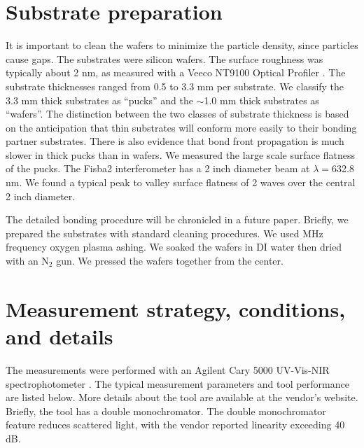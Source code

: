 \documentclass[osajnl,preprint,showpacs,superscriptaddress,12pt]{revtex4-1} %
\begin{document}
\section{Substrate preparation}
It is important to clean the wafers to minimize the particle density, since particles cause gaps.  The substrates were silicon wafers.  The surface roughness was typically about 2 nm, as measured with a Veeco NT9100 Optical Profiler .  The substrate thicknesses ranged from 0.5 to 3.3 mm per substrate.  We classify the 3.3 mm thick substrates as ``pucks'' and the $\sim$1.0 mm thick substrates as ``wafers''.  The distinction between the two classes of substrate thickness is based on the anticipation that thin substrates will conform more easily to their bonding partner substrates.  There is also evidence that bond front propagation is much slower in thick pucks \cite{2007ApOpt..46.6793H} than in wafers.  We measured the large scale surface flatness of the pucks.  The Fisba2 interferometer has a 2 inch diameter beam at $\lambda=$632.8 nm.  We found a typical peak to valley surface flatness of 2 waves over the central 2 inch diameter.


The detailed bonding procedure will be chronicled in a future paper.  Briefly, we prepared the substrates with standard cleaning procedures.  We used MHz frequency oxygen plasma ashing.  We soaked the wafers in DI water then dried with an N$_2$ gun.  We pressed the wafers together from the center.


\section{Measurement strategy, conditions, and details}
The measurements were performed with an Agilent Cary 5000 UV-Vis-NIR spectrophotometer \nocite{cary5000web}.  The typical measurement parameters and tool performance are listed below.  More details about the tool are available at the vendor's website.  Briefly, the tool has a double monochromator.  The double monochromator feature reduces scattered light, with the vendor reported linearity exceeding 40 dB.
\end{document}
